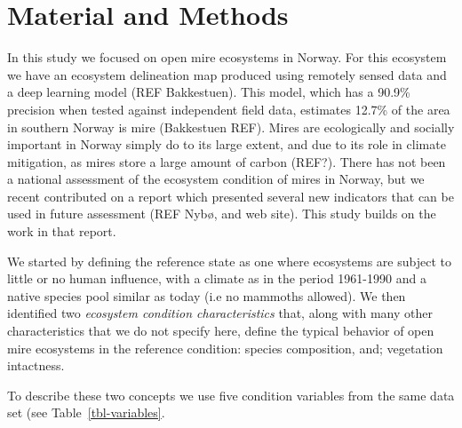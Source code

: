 \documentclass[
  super,
  preprint,
  3p]{elsarticle}
\begin{document}
\hypertarget{material-and-methods}{%
\section{Material and Methods}\label{material-and-methods}}

In this study we focused on open mire ecosystems in Norway. For this
ecosystem we have an ecosystem delineation map produced using remotely
sensed data and a deep learning model (REF Bakkestuen). This model,
which has a 90.9\% precision when tested against independent field data,
estimates 12.7\% of the area in southern Norway is mire (Bakkestuen
REF). Mires are ecologically and socially important in Norway simply do
to its large extent, and due to its role in climate mitigation, as mires
store a large amount of carbon (REF?). There has not been a national
assessment of the ecosystem condition of mires in Norway, but we recent
contributed on a report which presented several new indicators that can
be used in future assessment (REF Nybø, and web site). This study builds
on the work in that report.

We started by defining the reference state as one where ecosystems are
subject to little or no human influence, with a climate as in the period
1961-1990 and a native species pool similar as today (i.e no mammoths
allowed). We then identified two \emph{ecosystem condition
characteristics} that, along with many other characteristics that we do
not specify here, define the typical behavior of open mire ecosystems in
the reference condition: species composition, and; vegetation
intactness.

To describe these two concepts we use five condition variables from the
same data set (see Table~\ref{tbl-variables}.
\end{document}
